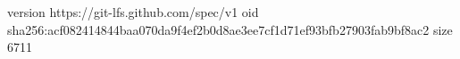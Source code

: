 version https://git-lfs.github.com/spec/v1
oid sha256:acf082414844baa070da9f4ef2b0d8ae3ee7cf1d71ef93bfb27903fab9bf8ac2
size 6711
